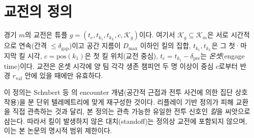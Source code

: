 
\section{교전의 정의}
\label{sec:problem-engagement}

\begin{definition}[킬 조건부 교전]
\label{def:engagement}
경기 $m$의 교전은 튜플 $g = (t_e, t_{k_1}, t_{k_L}, c, \mathcal{K}_g)$이다. 여기서 $\mathcal{K}_g \subseteq \mathcal{K}_m$은 서로 시간적으로 연속(간격 $\le \delta_{\mathrm{gap}}$)이고 공간 지름이 $D_{\max}$ 이하인 킬의 집합, $t_{k_1}, t_{k_L}$은 그 첫·마지막 킬 시각, $c = \mathrm{pos}(k_1)$은 첫 킬 위치(교전 중심), $t_e = t_{k_1} - \delta_{\mathrm{pre}}$는 \emph{온셋}(engage time)이다. 교전은 온셋 시각에 양 팀 각각 생존 챔피언 두 명 이상이 중심 $c$로부터 반경 $r_{\mathrm{val}}$ 안에 있을 때에만 유효하다.
\end{definition}

이 정의는 Schubert 등 \cite{schubert2016esports}의 encounter 개념(공간적 근접과 전투 사건에 의한 집단 상호작용)을 분 단위 텔레메트리에 맞게 재구성한 것이다. 리플레이 기반 정의가 피해 교환을 직접 관측하는 것과 달리, 본 정의는 관측 가능한 유일한 전투 신호인 \emph{킬}을 씨앗으로 삼는다. 따라서 킬이 발생하지 않은 대치(standoff)는 정의상 교전에 포함되지 않으며, 이는 본 논문의 명시적 범위 제한이다.
